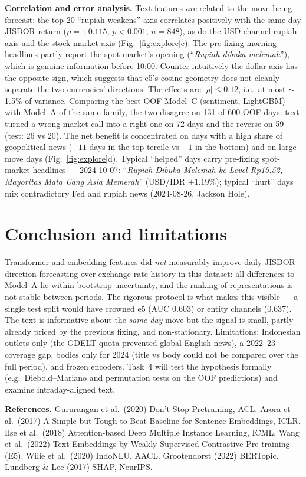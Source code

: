\documentclass[10pt,a4paper]{article}
\begin{document}
\textbf{Correlation and error analysis.} Text features \emph{are} related to the move being forecast: the top-20 ``rupiah weakens'' axis correlates positively with the same-day JISDOR return ($\rho=+0.115$, $p<0.001$, $n=848$), as do the USD-channel rupiah axis and the stock-market axis (Fig.~\ref{fig:explore}c). The pre-fixing morning headlines partly report the spot market's opening (``\emph{Rupiah dibuka melemah}''), which is genuine information before 10:00. Counter-intuitively the dollar axis has the opposite sign, which suggests that e5's cosine geometry does not cleanly separate the two currencies' directions. The effects are $|\rho|\le0.12$, i.e.\ at most $\sim$1.5\% of variance. Comparing the best OOF Model~C (sentiment, LightGBM) with Model~A of the same family, the two disagree on 131 of 600 OOF days: text turned a wrong market call into a right one on 72 days and the reverse on 59 (test: 26 vs 20). The net benefit is concentrated on days with a high share of geopolitical news ($+11$ days in the top tercile vs $-1$ in the bottom) and on large-move days (Fig.~\ref{fig:explore}d). Typical ``helped'' days carry pre-fixing spot-market headlines --- 2024-10-07: ``\emph{Rupiah Dibuka Melemah ke Level Rp15.52, Mayoritas Mata Uang Asia Memerah}'' (USD/IDR $+1.19\%$); typical ``hurt'' days mix contradictory Fed and rupiah news (2024-08-26, Jackson Hole).

\section{Conclusion and limitations}
Transformer and embedding features did \emph{not} measurably improve daily JISDOR direction forecasting over exchange-rate history in this dataset: all differences to Model~A lie within bootstrap uncertainty, and the ranking of representations is not stable between periods. The rigorous protocol is what makes this visible --- a single test split would have crowned e5 (AUC 0.603) or entity channels (0.637). The text is informative about the \emph{same-day} move but the signal is small, partly already priced by the previous fixing, and non-stationary. Limitations: Indonesian outlets only (the GDELT quota prevented global English news), a 2022--23 coverage gap, bodies only for 2024 (title vs body could not be compared over the full period), and frozen encoders. Task~4 will test the hypothesis formally (e.g.\ Diebold--Mariano and permutation tests on the OOF predictions) and examine intraday-aligned text.

\vspace{-0.3em}
{\footnotesize \textbf{References.} Gururangan et al.\ (2020) Don't Stop Pretraining, ACL. Arora et al.\ (2017) A Simple but Tough-to-Beat Baseline for Sentence Embeddings, ICLR. Ilse et al.\ (2018) Attention-based Deep Multiple Instance Learning, ICML. Wang et al.\ (2022) Text Embeddings by Weakly-Supervised Contrastive Pre-training (E5). Wilie et al.\ (2020) IndoNLU, AACL. Grootendorst (2022) BERTopic. Lundberg \& Lee (2017) SHAP, NeurIPS.}
\end{document}
